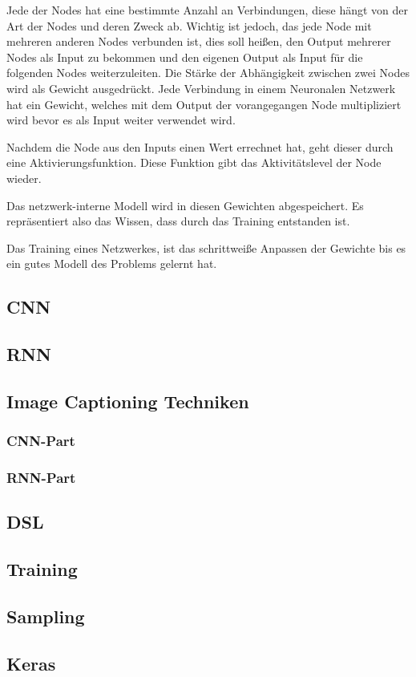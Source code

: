 \documentclass[pdftex,a4paper,halfparskip]{scrartcl}
\begin{document}
Jede der Nodes hat eine bestimmte Anzahl an Verbindungen, diese hängt von der Art der Nodes und deren Zweck ab. Wichtig ist jedoch, das jede Node mit mehreren anderen Nodes verbunden ist, dies soll heißen, den Output mehrerer Nodes als Input zu bekommen und den eigenen Output als Input für die folgenden Nodes weiterzuleiten. Die Stärke der Abhängigkeit zwischen zwei Nodes wird als Gewicht ausgedrückt. Jede Verbindung in einem Neuronalen Netzwerk hat ein Gewicht, welches mit dem Output der vorangegangen Node multipliziert wird bevor es als Input weiter verwendet wird. 

Nachdem die Node aus den Inputs einen Wert errechnet hat, geht dieser durch eine Aktivierungsfunktion. Diese Funktion gibt das Aktivitätslevel der Node wieder. 

Das netzwerk-interne Modell wird in diesen Gewichten abgespeichert. Es repräsentiert also das Wissen, dass durch das Training entstanden ist.

Das Training eines Netzwerkes, ist das schrittweiße Anpassen der Gewichte bis es ein gutes Modell des Problems gelernt hat. 
\subsection{CNN}
\subsection{RNN}
\subsection{Image Captioning Techniken}
\subsubsection{CNN-Part}
\subsubsection{RNN-Part}
\subsection{DSL}
\subsection{Training}
\subsection{Sampling}
\subsection{Keras}
\end{document}
